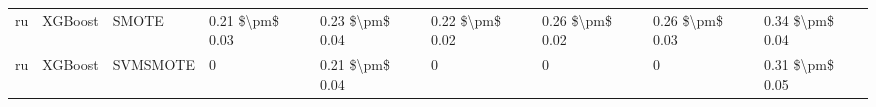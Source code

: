 \begin{tabular}{lllllllll}
      ru &                         XGBoost &                         SMOTE &     0.21 \$\textbackslash pm\$ 0.03 &           0.23 \$\textbackslash pm\$ 0.04 &       0.22 \$\textbackslash pm\$ 0.02 &        0.26 \$\textbackslash pm\$ 0.02 &                         0.26 \$\textbackslash pm\$ 0.03 &     0.34 \$\textbackslash pm\$ 0.04 \\
      ru &                         XGBoost &                      SVMSMOTE &                   0 &           0.21 \$\textbackslash pm\$ 0.04 &                     0 &                      0 &                                       0 &     0.31 \$\textbackslash pm\$ 0.05 \\
\bottomrule
\end{tabular}
